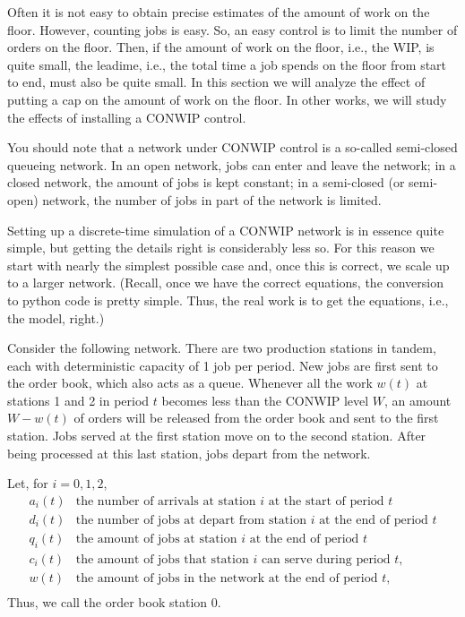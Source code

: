 \documentclass{scrartcl}
\begin{document}
Often it is not easy to obtain precise estimates of the amount of work on the floor.
However, counting jobs is easy.
So, an easy control is to limit the number of orders on the floor.
Then, if the amount of work on the floor, i.e., the WIP, is quite small, the leadime, i.e., the total time a job spends on the floor from start to end, must also be quite small.
In this section we will analyze the effect of putting a cap on the amount of work on the floor.
In other works, we will study the effects of installing a CONWIP control.

You should note that a network under CONWIP control is a so-called semi-closed queueing network.
In an open network, jobs can enter and leave the network; in a closed network, the amount of jobs is kept constant; in a semi-closed (or semi-open) network, the number of jobs in part of the network is limited.

Setting up a discrete-time simulation of a CONWIP network is in essence quite simple, but getting the details right is considerably less so.
For this reason we start with nearly the simplest possible case and, once this is correct, we scale up to a larger network.
(Recall, once we have the correct equations, the conversion to python code is pretty simple.
Thus, the real work is to get the equations, i.e., the model, right.)

Consider the following network.
There are two production stations in tandem, each with deterministic capacity of 1 job per period.
New jobs are first sent to the order book, which also acts as a queue.
Whenever all the work $w(t)$ at stations 1 and 2 in period $t$ becomes less than the CONWIP level $W$, an amount $W-w(t)$ of orders will be released from the order book and sent to the first station.
Jobs served at the first station move on to the second station.
After being processed at this last station, jobs depart from the network.


Let, for $i=0, 1, 2$, 
\begin{align*}
a_i(t) & \text{the number of arrivals at station $i$  at the start of period $t$} \\
d_i(t) & \text{the number of jobs at depart from station $i$  at the end of period $t$} \\
q_i(t) & \text{the amount of jobs at station $i$  at the end of period $t$} \\
c_i(t) & \text{the amount of jobs that station $i$  can serve during  period $t$}, \\
w(t) & \text{the amount of jobs in the network at the end of period $t$}, \\
\end{align*}
Thus, we call the order book station $0$. 
\end{document}
